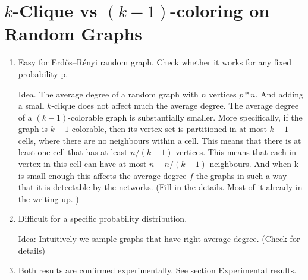 \section{$k$-Clique vs $(k-1)$-coloring on Random Graphs}

\begin{enumerate}
    \item Easy for Erdős–Rényi random graph. Check whether it works for any fixed probability p.

    Idea. The average degree of a random graph with $n$ vertices $p*n$. And adding a small $k$-clique does not affect much the average degree. 
    The average degree of a $(k-1)$-colorable graph is substantially smaller. More specifically, if the graph is $k-1$ colorable, then its vertex set 
    is partitioned in at most $k-1$ cells, where there are no neighbours within a cell. This means that there is at least one cell that has at least $n/(k-1)$ vertices. This means that 
    each in vertex in this cell can have at most $n-n/(k-1)$ neighbours. And when k is small enough this affects the average degree $f$ the graphs in such a way that it is detectable by the networks. 
    (Fill in the details. Most of it already in the writing up. )

    \item Difficult for a specific probability distribution. 
    
    Idea: Intuitively we sample graphs that have right average degree. (Check for details)
        
 
    \item  Both results are confirmed experimentally. See section Experimental results. 
    
\end{enumerate}